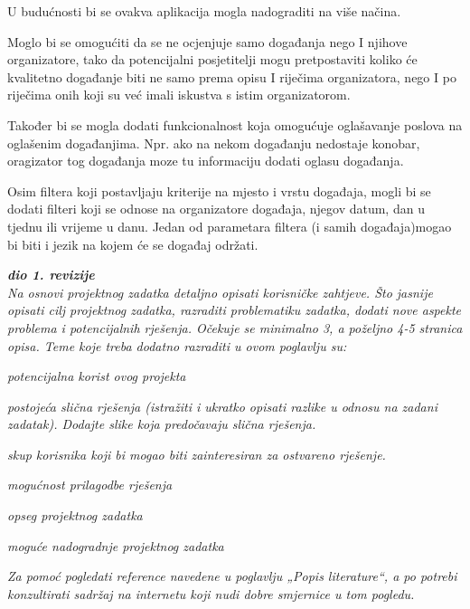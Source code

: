 	U budućnosti bi se ovakva aplikacija mogla nadograditi na više načina.
 
	Moglo bi se omogućiti da se ne ocjenjuje samo događanja nego I njihove organizatore, tako da potencijalni posjetitelji mogu pretpostaviti koliko će kvalitetno događanje biti ne samo prema opisu I riječima organizatora, nego I po riječima onih koji su već imali iskustva s istim organizatorom.
 
	Također bi se mogla dodati funkcionalnost koja omogućuje oglašavanje poslova na oglašenim događanjima. Npr. ako na nekom događanju nedostaje konobar, oragizator tog događanja moze tu informaciju dodati oglasu događanja. 
 
	Osim filtera koji postavljaju kriterije na mjesto i vrstu događaja, mogli bi se dodati filteri koji se odnose na organizatore događaja, njegov datum, dan u tjednu ili vrijeme u danu. Jedan od parametara filtera (i samih događaja)mogao bi biti i jezik na kojem će se događaj održati.

			
		
		\textbf{\textit{dio 1. revizije}}\\
		
		\textit{Na osnovi projektnog zadatka detaljno opisati korisničke zahtjeve. Što jasnije opisati cilj projektnog zadatka, razraditi problematiku zadatka, dodati nove aspekte problema i potencijalnih rješenja. Očekuje se minimalno 3, a poželjno 4-5 stranica opisa.	Teme koje treba dodatno razraditi u ovom poglavlju su:}
		\begin{packed_item}
			\item \textit{potencijalna korist ovog projekta}
			\item \textit{postojeća slična rješenja (istražiti i ukratko opisati razlike u odnosu na zadani zadatak). Dodajte slike koja predočavaju slična rješenja.}
			\item \textit{skup korisnika koji bi mogao biti zainteresiran za ostvareno rješenje.}
			\item \textit{mogućnost prilagodbe rješenja }
			\item \textit{opseg projektnog zadatka}
			\item \textit{moguće nadogradnje projektnog zadatka}
		\end{packed_item}
		
		\textit{Za pomoć pogledati reference navedene u poglavlju „Popis literature“, a po potrebi konzultirati sadržaj na internetu koji nudi dobre smjernice u tom pogledu.}
		\eject
		
